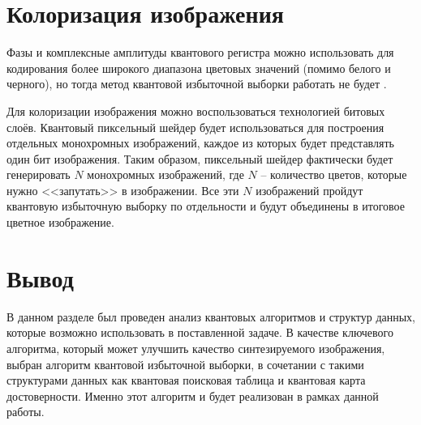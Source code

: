 \section{Колоризация изображения}

Фазы и комплексные амплитуды квантового регистра можно использовать для кодирования более широкого диапазона цветовых значений (помимо белого и черного), но тогда метод квантовой избыточной выборки работать не будет \cite{PQC}. 

Для колоризации изображения можно воспользоваться технологией битовых слоёв. Квантовый пиксельный шейдер будет использоваться для построения отдельных монохромных изображений, каждое из которых будет представлять один бит изображения. Таким образом, пиксельный шейдер фактически будет генерировать $N$ монохромных изображений, где $N$ -- количество цветов, которые нужно <<запутать>> в изображении. Все эти $N$ изображений пройдут квантовую избыточную выборку по отдельности и будут объединены в итоговое цветное изображение.

\section*{Вывод}

В данном разделе был проведен анализ квантовых алгоритмов и структур данных, которые возможно использовать в поставленной задаче. В качестве ключевого алгоритма, который может улучшить качество синтезируемого изображения, выбран алгоритм квантовой избыточной выборки, в сочетании с такими структурами данных как квантовая поисковая таблица и квантовая карта достоверности. Именно этот алгоритм и будет реализован в рамках данной работы.